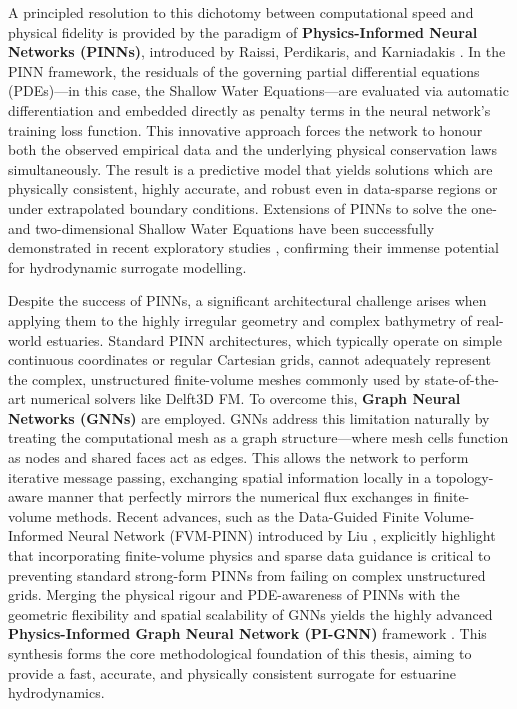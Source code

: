 A principled resolution to this dichotomy between computational speed and physical fidelity is provided by
the paradigm of \textbf{Physics-Informed Neural Networks (PINNs)}, introduced by Raissi,
Perdikaris, and Karniadakis \cite{Raissi2019}. In the PINN framework,
the residuals of the governing partial differential equations (PDEs)---in this case, the Shallow Water Equations---are
evaluated via automatic differentiation and embedded directly as penalty terms in
the neural network's training loss function. This innovative approach forces the network to honour both
the observed empirical data and the underlying physical conservation laws simultaneously. The result is a predictive model that yields solutions which are physically consistent, highly accurate, and robust even in data-sparse
regions or under extrapolated boundary conditions. Extensions of PINNs to solve the one- and two-dimensional Shallow
Water Equations have been successfully demonstrated in recent exploratory studies
\cite{Tian2025, Yin2024, Dazzi2024}, confirming their immense potential for
hydrodynamic surrogate modelling.

Despite the success of PINNs, a significant architectural challenge arises when applying them to the highly irregular geometry
and complex bathymetry of real-world estuaries. Standard PINN architectures, which typically operate on simple continuous coordinates or regular Cartesian grids, cannot
adequately represent the complex, unstructured finite-volume meshes commonly used by state-of-the-art
numerical solvers like Delft3D FM. To overcome this, \textbf{Graph Neural Networks (GNNs)}
\cite{Scarselli2009, Gilmer2017} are employed. GNNs address this limitation naturally by
treating the computational mesh as a graph structure---where mesh cells function as nodes and shared faces act as edges. This allows the network to perform iterative message passing, exchanging spatial information locally in a
topology-aware manner that perfectly mirrors the numerical flux exchanges in finite-volume methods. Recent advances, such as the Data-Guided Finite Volume-Informed Neural Network (FVM-PINN) introduced by Liu \cite{Liu2026}, explicitly highlight that incorporating finite-volume physics and sparse data guidance is critical to preventing standard strong-form PINNs from failing on complex unstructured grids. Merging the physical rigour and PDE-awareness of PINNs with the
geometric flexibility and spatial scalability of GNNs yields the highly advanced \textbf{Physics-Informed Graph
Neural Network (PI-GNN)} framework \cite{Taghizadeh2025}. This synthesis forms the core
methodological foundation of this thesis, aiming to provide a fast, accurate, and physically consistent surrogate for estuarine hydrodynamics.


